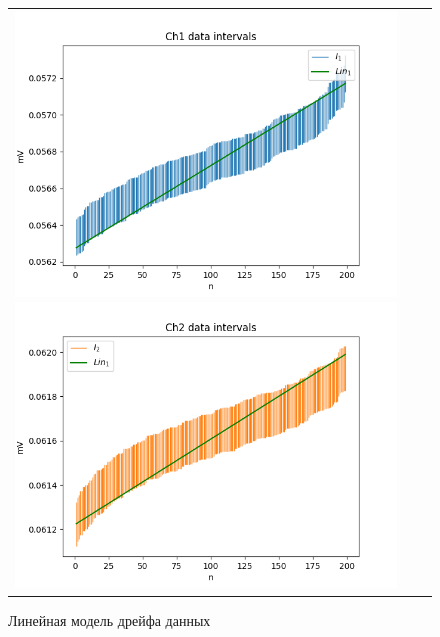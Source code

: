 \documentclass[../main.tex]{subfiles}
\begin{document}
\begin{figure}[H]
	\begin{tabular}{ccc}
		\includegraphics[scale=0.5]{figures/lr_PR1.png}
		\includegraphics[scale=0.5]{figures/lr_PR2.png}
	\end{tabular}
	\caption{Линейная модель дрейфа данных} 
\end{figure}
\end{document}
